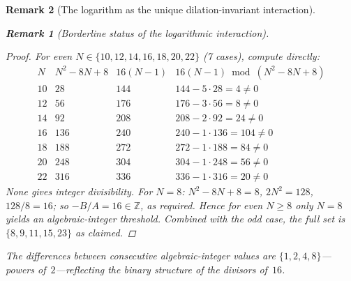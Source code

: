 \documentclass[12pt, a4paper]{article}
\newtheorem{remark}{Remark}[section]
\numberwithin{equation}{section}
\begin{document}
\begin{remark}[The logarithm as the unique dilation-invariant interaction]
\begin{remark}[Borderline status of the logarithmic interaction]
\begin{proof}
For even $N \in \{10, 12, 14, 16, 18, 20, 22\}$ (7 cases), compute
directly:
\[
\renewcommand{\arraystretch}{1.1}
\begin{array}{c|c|c|c}
N & N^2{-}8N{+}8 & 16(N{-}1) & 16(N{-}1) \bmod (N^2{-}8N{+}8) \\\hline
10 & 28  & 144 & 144 - 5\cdot 28 = 4 \ne 0 \\
12 & 56  & 176 & 176 - 3\cdot 56 = 8 \ne 0 \\
14 & 92  & 208 & 208 - 2\cdot 92 = 24 \ne 0 \\
16 & 136 & 240 & 240 - 1\cdot 136 = 104 \ne 0 \\
18 & 188 & 272 & 272 - 1\cdot 188 = 84 \ne 0 \\
20 & 248 & 304 & 304 - 1\cdot 248 = 56 \ne 0 \\
22 & 316 & 336 & 336 - 1\cdot 316 = 20 \ne 0
\end{array}
\]
None gives integer divisibility.  For $N = 8$:
$N^2{-}8N{+}8 = 8$, $2N^2 = 128$, $128/8 = 16$; so
$-B/A = 16 \in \mathbb{Z}$, as required.
Hence for even $N \ge 8$ only $N = 8$ yields an algebraic-integer
threshold.  Combined with the odd case, the full set is
$\{8, 9, 11, 15, 23\}$ as claimed.
\end{proof}

The differences between consecutive algebraic-integer values
are $\{1, 2, 4, 8\}$---powers of~$2$---reflecting the
binary structure of the divisors of~$16$.


\end{remark}
\end{remark}
\end{document}
